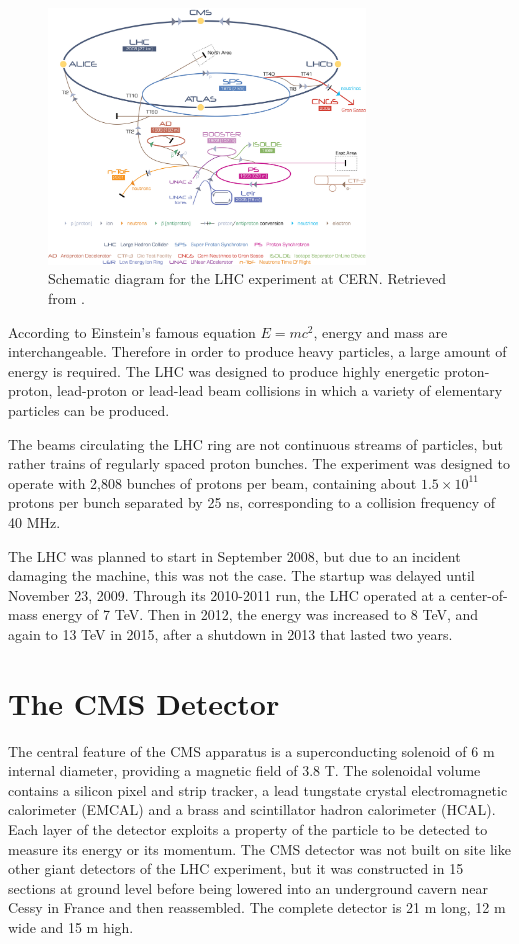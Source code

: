  \begin{figure}[H]
 	\centering
 	\includegraphics[width=0.75\textwidth]{figures/Cern-Accelerator-Complex.jpg}
 	\singlespace
 	\caption{Schematic diagram for the LHC experiment at CERN. Retrieved from \cite{LHC-schematic}.}
 	\label{fig:lhcdia}
 \end{figure}

 According to Einstein's famous equation $E=mc^{2}$, energy and mass are interchangeable. Therefore in order to produce heavy particles, a large amount of energy is required. The LHC was designed to produce highly energetic proton-proton, lead-proton or lead-lead beam collisions in which a variety of elementary particles can be produced.

 The beams circulating the LHC ring are not continuous streams of particles, but rather trains of regularly spaced proton bunches. The experiment was designed to operate with 2,808 bunches of protons per beam, containing about $1.5\times10^{11}$ protons per bunch separated by 25 ns, corresponding to a collision frequency of 40 MHz. 

The LHC was planned to start in September 2008, but due to an incident damaging the machine, this was not the case. The startup was delayed until November 23, 2009. Through its 2010-2011 run, the LHC operated at a center-of-mass energy of 7 TeV. Then in 2012, the energy was increased to 8 TeV, and again to 13 TeV in 2015, after a shutdown in 2013 that lasted two years.


\section{The CMS Detector}

The central feature of the CMS apparatus is a superconducting solenoid of 6 m internal diameter, providing a magnetic field of 3.8 T. The solenoidal volume contains a silicon pixel and strip tracker, a lead tungstate crystal electromagnetic calorimeter (EMCAL) and a brass and scintillator hadron calorimeter (HCAL). Each layer of the detector exploits a property of the particle to be detected to measure its energy or its momentum. 
The CMS detector was not built on site like other giant detectors of the LHC experiment, but it was constructed in 15 sections at ground level before being lowered into an underground cavern near Cessy in France and then reassembled. The complete detector is 21 m long, 12 m wide and 15 m high.

